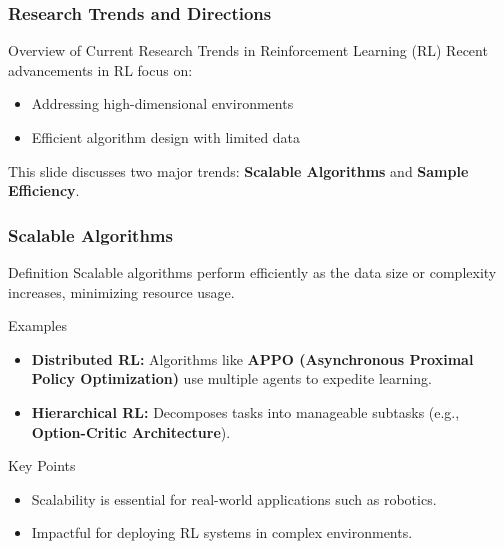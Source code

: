 \documentclass{beamer}
\begin{document}
\begin{frame}[fragile]
    \frametitle{Research Trends and Directions}
    \begin{block}{Overview of Current Research Trends in Reinforcement Learning (RL)}
        Recent advancements in RL focus on:
        \begin{itemize}
            \item Addressing high-dimensional environments
            \item Efficient algorithm design with limited data
            \end{itemize}
        This slide discusses two major trends: \textbf{Scalable Algorithms} and \textbf{Sample Efficiency}.
    \end{block}
\end{frame}

\begin{frame}[fragile]
    \frametitle{Scalable Algorithms}
    \begin{block}{Definition}
        Scalable algorithms perform efficiently as the data size or complexity increases, minimizing resource usage.
    \end{block}
    
    \begin{block}{Examples}
        \begin{itemize}
            \item \textbf{Distributed RL:} 
            Algorithms like \textbf{APPO (Asynchronous Proximal Policy Optimization)} use multiple agents to expedite learning.
            \item \textbf{Hierarchical RL:} 
            Decomposes tasks into manageable subtasks (e.g., \textbf{Option-Critic Architecture}).
        \end{itemize}
    \end{block}
    
    \begin{block}{Key Points}
        \begin{itemize}
            \item Scalability is essential for real-world applications such as robotics.
            \item Impactful for deploying RL systems in complex environments.
        \end{itemize}
    \end{block}
\end{frame}
\end{document}
